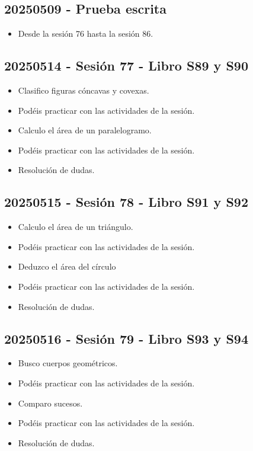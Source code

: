 \documentclass[a4paper,12pt]{article}
\begin{document}
\subsection{20250509 - Prueba escrita}

\begin{itemize}
    \item Desde la sesión 76 hasta la sesión 86.
\end{itemize}

\subsection{20250514 - Sesión 77 - Libro S89 y S90}

\begin{itemize}
    \item Clasifico figuras cóncavas y covexas.
    \item Podéis practicar con las actividades de la sesión.
    \item Calculo el área de un paralelogramo.
    \item Podéis practicar con las actividades de la sesión.
    \item Resolución de dudas.
\end{itemize}

\subsection{20250515 - Sesión 78 - Libro S91 y S92}

\begin{itemize}
    \item Calculo el área de un triángulo.
    \item Podéis practicar con las actividades de la sesión.
    \item Deduzco el área del círculo
    \item Podéis practicar con las actividades de la sesión.
    \item Resolución de dudas.
\end{itemize}

\subsection{20250516 - Sesión 79 - Libro S93 y S94}

\begin{itemize}
    \item Busco cuerpos geométricos.
    \item Podéis practicar con las actividades de la sesión.
    \item Comparo sucesos.
    \item Podéis practicar con las actividades de la sesión.
    \item Resolución de dudas.
\end{itemize}
\end{document}
